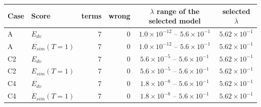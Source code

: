 \begin{tabular}{llrrcc}\toprule Case & Score & terms & wrong & $\lambda$ range of the selected model & selected $\lambda$\\\midrule
A & $E_{dv}$ & 7 & 0 & $1.0\!\times\!10^{-12}$ -- $5.6\!\times\!10^{-1}$ & $5.62\!\times\!10^{-1}$\\
A & $E_{sim}(T{=}1)$ & 7 & 0 & $1.0\!\times\!10^{-12}$ -- $5.6\!\times\!10^{-1}$ & $5.62\!\times\!10^{-1}$\\
C2 & $E_{dv}$ & 7 & 0 & $5.6\!\times\!10^{-5}$ -- $5.6\!\times\!10^{-1}$ & $5.62\!\times\!10^{-1}$\\
C2 & $E_{sim}(T{=}1)$ & 7 & 0 & $5.6\!\times\!10^{-5}$ -- $5.6\!\times\!10^{-1}$ & $5.62\!\times\!10^{-1}$\\
C4 & $E_{dv}$ & 7 & 0 & $1.8\!\times\!10^{-8}$ -- $5.6\!\times\!10^{-1}$ & $5.62\!\times\!10^{-1}$\\
C4 & $E_{sim}(T{=}1)$ & 7 & 0 & $1.8\!\times\!10^{-8}$ -- $5.6\!\times\!10^{-1}$ & $5.62\!\times\!10^{-1}$\\
\bottomrule\end{tabular}